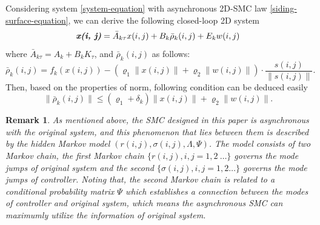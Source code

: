 \documentclass[conference]{IEEEtran}
\newtheorem{remark}{Remark}
\begin{document}
	Considering system \eqref{system-equation} with asynchronous 2D-SMC law \eqref{siding-surface-equation}, we can derive the following closed-loop 2D system 
	\begin{equation} \label{closed-loop-system-equation}
	\emph{\textbf{x(i, j)}} = \bar{A}_{k\tau }x(i,j)+B_{k}\bar{\rho}_{k}(i,j)+E_{k}w(i,j)
	\end{equation}
	where $\bar{A}_{k\tau } = A_{k}+B_{k}K_{\tau }$, and $\bar{\rho}_{k}(i,j)$ as follows:
	\begin{equation*}
	\bar\rho_{k}(i,j)=f_{k}(x(i,j))-(\varrho_{1}\|x(i,j)\|+\varrho_{2}\|w(i,j)\|)\cdot\frac{s(i,j)}{\|s(i,j)\|}.
	\end{equation*}
	Then, based on the properties of norm, following condition can be deduced easily
	\begin{equation}\label{norm-rho-inequality}
	\|\bar{\rho}_{k}(i,j)\| \leq (\varrho_{1}+\delta_{k})\|x(i,j)\| + \varrho_{2}\|w(i,j)\| .
	\end{equation} 
		
	\begin{remark}
		As mentioned above, the SMC  designed in this paper is  asynchronous with the original system, and this phenomenon that lies between them is described by the hidden Markov model $(r(i,j),\sigma(i,j),\varLambda,\varPsi)$. The model consists of two Markov chain, the first Markov chain $\{r(i,j), i,j=1,2\ \dots\}$ governs the mode jumps of original system and the second $\{ \sigma(i,j), i,j=1,2\dots \}$ governs the mode jumps of controller. Noting that, the second Markov chain is related to a conditional probability matrix $\varPsi$ which establishes a connection between the modes of controller and original system, which  means the asynchronous SMC can  maximumly  utilize the information of original system.
	\end{remark}
\end{document}
